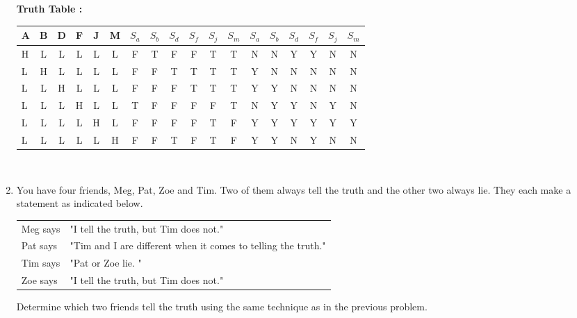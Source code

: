 \documentclass[a4paper,11pt]{article}
\begin{document}
\begin{enumerate}
\textbf{Truth Table :} \\
\begin{tabular}{ l  c  c  c  c  c  ||  c  c  c  c  c  c  ||  c  c  c  c  c  c    }
 A & B & D & F & J & M  & $S_a$ & $S_b$ & $S_d$ & $S_f$ & $S_j$ & $S_m$  & $S_a$ & $S_b$ & $S_d$ & $S_f$ & $S_j$ & $S_m$ \\ \hline
  H & L & L & L & L & L   & F & T & F & F & T & T  & N & N & Y & Y & N & N \\
  L & H & L & L & L & L   & F & F & T & T & T & T  & Y & N & N & N & N & N \\ 
  L & L & H & L & L & L   & F & F & F & T & T & T  & Y & Y & N & N & N & N \\
  L & L & L & H & L & L   & T & F & F & F & F & T  & N & Y & Y & N & Y & N \\
  L & L & L & L & H & L   & F & F & F & F & T & F  & Y & Y & Y & Y & Y & Y \\
  L & L & L & L & L & H   & F & F & T & F & T & F  & Y & Y & N & Y & N & N \\
\end{tabular} \\[.2in]






\item You have four friends, Meg, Pat, Zoe and Tim. Two of them always tell the truth and the
other two always lie. They each make a statement as indicated below. \\[.2in]
\begin{tabular}{l l}
Meg says & "I tell the truth, but Tim does not." \\
Pat says & "Tim and I are different when it comes to telling the truth." \\
Tim says & "Pat or Zoe lie. " \\
Zoe says & "I tell the truth, but Tim does not." \\[.2in]
\end{tabular}

Determine which two friends tell the truth using the same technique as in the previous problem. \\


\end{enumerate}
\end{document}
